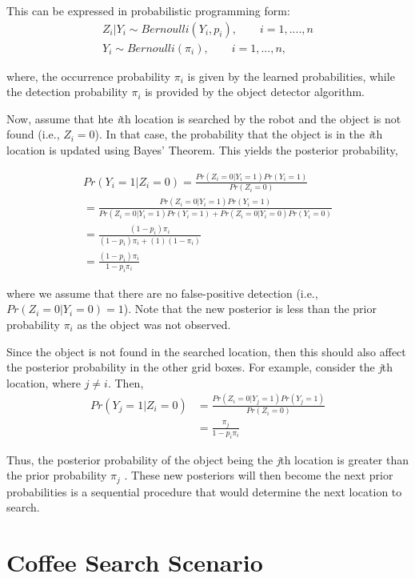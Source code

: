 This can be expressed in probabilistic programming form:
\begin{gather}
	Z_i | Y_i \sim Bernoulli (Y_i, p_i), \qquad  i  = 1,....,n \\
	Y_i \sim Bernoulli(\pi_i),\qquad   i = 1,...,n,
\end{gather}

where, the occurrence probability {$\pi_i$} is given by the learned probabilities, while the detection probability {$\pi_i$} is provided by the object detector algorithm.

Now, assume that hte \emph{i}th location is searched by the robot and the object is not found (i.e., $Z_i = 0$). In that case, the probability that the object is in the \emph{i}th location is updated using Bayes' Theorem. This yields the posterior probability,

\begin{gather*}
	Pr(Y_i = 1 | Z_i = 0) = \frac{Pr(Z_i = 0|Y_i=1)Pr(Y_i=1)} {Pr(Z_i=0)} \\
	                       = \frac{Pr(Z_i = 0| Y_i =1 )Pr(Y_i =1)}{Pr(Z_i=0|Y_i =1)Pr(Y_i = 1) + Pr(Z_i=0|Y_i=0)Pr(Y_i=0)} \\
	                       = \frac{(1 - p_i)\pi_i}{(1 - p_i)\pi_i + (1)(1 - \pi_i)} \\
	                       = \frac{(1 - p_i)\pi_i}{1 - p_i\pi_i}
\end{gather*}

where we assume that there are no false-positive detection (i.e., $Pr(Z_i =0| Y_i = 0) = 1$). Note that the new posterior is less than the prior probability $\pi_i$ as the object was not observed.

Since the object is not found in the searched location, then this should also affect the posterior probability in the other grid boxes. For example, consider the \emph{j}th location, where $j \neq i$. Then,
\begin{align*}
	Pr(Y_j = 1 | Z_i=0) &= \frac{Pr(Z_i = 0 | Y_j = 1)Pr(Y_j = 1)}{Pr(Z_i = 0)} \\
	                    &= \frac{\pi_j}{ 1 - p_i\pi_i}
\end{align*}

Thus, the posterior probability of the object being the \emph{j}th location is greater than the prior probability $\pi_j$ . These new posteriors will then become the next prior probabilities is a sequential procedure that would determine the next location to search.


\section{Coffee Search Scenario}

